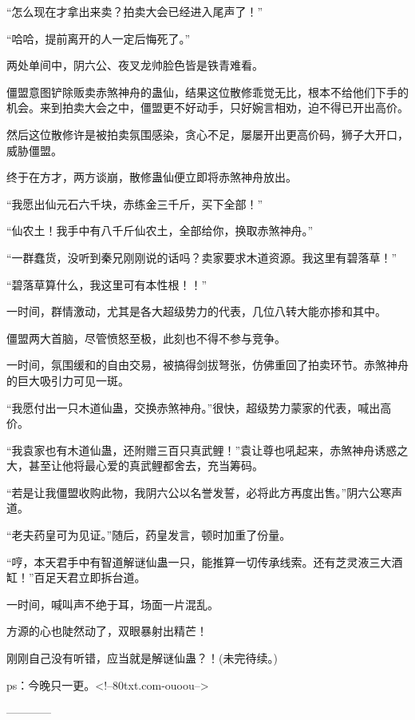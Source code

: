 \begin{this_body}
“怎么现在才拿出来卖？拍卖大会已经进入尾声了！”

“哈哈，提前离开的人一定后悔死了。”

两处单间中，阴六公、夜叉龙帅脸色皆是铁青难看。

僵盟意图铲除贩卖赤煞神舟的蛊仙，结果这位散修乖觉无比，根本不给他们下手的机会。来到拍卖大会之中，僵盟更不好动手，只好婉言相劝，迫不得已开出高价。

然后这位散修许是被拍卖氛围感染，贪心不足，屡屡开出更高价码，狮子大开口，威胁僵盟。

终于在方才，两方谈崩，散修蛊仙便立即将赤煞神舟放出。

“我愿出仙元石六千块，赤练金三千斤，买下全部！”

“仙农土！我手中有八千斤仙农土，全部给你，换取赤煞神舟。”

“一群蠢货，没听到秦兄刚刚说的话吗？卖家要求木道资源。我这里有碧落草！”

“碧落草算什么，我这里可有本性根！！”

一时间，群情激动，尤其是各大超级势力的代表，几位八转大能亦掺和其中。

僵盟两大首脑，尽管愤怒至极，此刻也不得不参与竞争。

一时间，氛围缓和的自由交易，被搞得剑拔弩张，仿佛重回了拍卖环节。赤煞神舟的巨大吸引力可见一斑。

“我愿付出一只木道仙蛊，交换赤煞神舟。”很快，超级势力蒙家的代表，喊出高价。

“我袁家也有木道仙蛊，还附赠三百只真武鲤！”袁让尊也吼起来，赤煞神舟诱惑之大，甚至让他将最心爱的真武鲤都舍去，充当筹码。

“若是让我僵盟收购此物，我阴六公以名誉发誓，必将此方再度出售。”阴六公寒声道。

“老夫药皇可为见证。”随后，药皇发言，顿时加重了份量。

“哼，本天君手中有智道解谜仙蛊一只，能推算一切传承线索。还有芝灵液三大酒缸！”百足天君立即拆台道。

一时间，喊叫声不绝于耳，场面一片混乱。

方源的心也陡然动了，双眼暴射出精芒！

刚刚自己没有听错，应当就是解谜仙蛊？！(未完待续。)

ps：今晚只一更。<!--80txt.com-ouoou-->

------------

\end{this_body}

